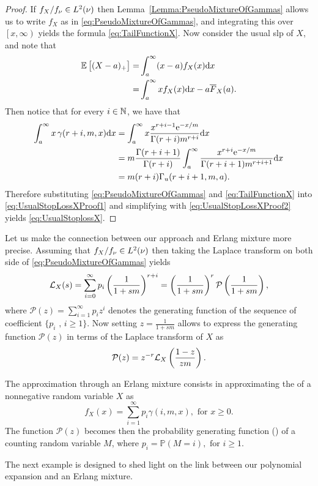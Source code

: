 \begin{proof}
If $f_{X}/f_\nu\in L^2(\nu)$ then Lemma~\ref{Lemma:PseudoMixtureOfGammas} allows us to write $f_X$ as in \eqref{eq:PseudoMixtureOfGammas}, and integrating this over $\left[x,\infty\right)$ yields the formula \eqref{eq:TailFunctionX}.
Now consider the usual slp of $X$, and note that
\begin{align}
\mathbb E\left[(X-a)_+\right]=&\int_{a}^{\infty}(x-a)f_{X}(x)\mathrm{d} x \nonumber\\
=&\int_{a}^{\infty}xf_{X}(x)\mathrm{d} x-a\overline{F}_{X}(a).\label{eq:UsualStopLossXProof1}
\end{align}
Then notice that for every $i \in \mathbb N$, we have that
\begin{align}
\int_{a}^{\infty} x \, \gamma(r+i, m, x)\mathrm{d} x
&= \int_{a}^{\infty}x\frac{x^{r+i-1} \mathrm{e}^{-x/m}}{\Gamma(r+i)m^{r+i}}\mathrm{d} x\nonumber\\
&= m\frac{\Gamma(r+i+1)}{\Gamma(r+i)}\int_{a}^{\infty}\frac{x^{r+i} \mathrm{e}^{-x/m}}{\Gamma(r+i+1)m^{r+i+1}}\mathrm{d} x\nonumber\\
&= m (r+i) \Gamma_{u}(r+i+1,m,a).\label{eq:UsualStopLossXProof2}
\end{align}
Therefore substituting \eqref{eq:PseudoMixtureOfGammas} and \eqref{eq:TailFunctionX} into \eqref{eq:UsualStopLossXProof1} and simplifying with \eqref{eq:UsualStopLossXProof2} yields \eqref{eq:UsualStoplossX}.

\end{proof}
Let us make the connection between our approach and Erlang mixture more precise. Assuming that $f_{X}/f_{\nu}\in L^2(\nu)$ then taking the Laplace transform on both side of \eqref{eq:PseudoMixtureOfGammas} yields
\begin{equation*}
\mathcal{L}_{X}(s)=\sum_{i=0}^{\infty} p_i \left(\frac{1}{1+sm}\right)^{r+i}
=\left(\frac{1}{1+sm}\right)^{r}\mathcal{P}\left(\frac{1}{1+sm}\right),\label{eq:PseudoErlangMixtureLaplaceTransform}
\end{equation*}
where $\mathcal{P}(z)=\sum_{i=1}^{\infty}p_i z^{i}$ denotes the generating function of the sequence of coefficient $\{p_i\text{ , }i\geq1\}$. Now setting $z=\frac{1}{1+sm}$ allows to express the generating function $\mathcal{P}(z)$ in terms of the Laplace transform of $X$ as
\begin{equation*}\label{eq:GeneratingFunctionPi}
\mathcal{P}(z)=z^{-r}\mathcal{L}_{X}\left(\frac{1-z}{zm}\right).
\end{equation*}

\begin{remark}
The approximation through an Erlang mixture consists in approximating the \pdf of a nonnegative random variable $X$ as
\begin{equation*}\label{eq:ErlangMixtureRepresentation}
f_X(x)=\sum_{i=1}^{\infty}p_i\gamma(i,m,x),\text{ for }x\geq0.
\end{equation*}
The function $\mathcal{P}(z)$ becomes then the probability generating function (\pgf) of a counting random variable $M$, where $p_i=\mathbb{P}(M=i),\text{ for }i\geq1$.
\end{remark}
The next example is designed to shed light on the link between our polynomial expansion and an Erlang mixture.

